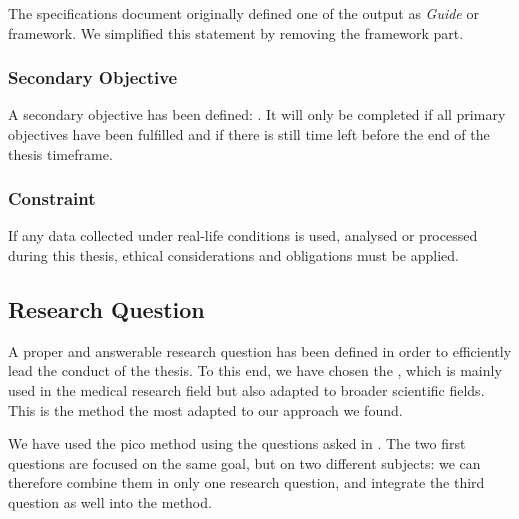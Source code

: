 The specifications document originally defined one of the output as \textit{Guide} or \Gls{framework}. We simplified this statement by removing the \gls{framework} part.

\subsubsection{Secondary Objective}
\label{subsubsec:introduction_objectives_secondary}

A secondary objective has been defined: . It will only be completed if all primary objectives have been fulfilled and if there is still time left before the end of the thesis timeframe.

\subsubsection{Constraint}
\label{subsubsec:introduction_objectives_constraint}

If any data collected under real-life conditions is used, analysed or processed during this thesis, ethical considerations and obligations must be applied.

\subsection{Research Question}
\label{subsec:introduction_contribution_question}

A proper and answerable research question has been defined in order to efficiently lead the conduct of the thesis. To this end, we have chosen the , which is mainly used in the medical research field but also adapted to broader scientific fields. This is the method the most adapted to our approach we found.

We have used the \gls{pico} method using the questions asked in . The two first questions are focused on the same goal, but on two different subjects: we can therefore combine them in only one research question, and integrate the third question as well into the method.

